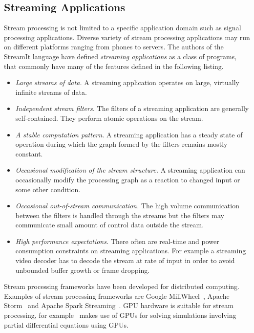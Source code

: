 \subsection{Streaming Applications}
\label{subsec:streaming-applications}
Stream processing is not limited to a specific application domain such as signal processing applications. Diverse variety of stream processing applications may run on different platforms ranging from phones to servers. The authors of the StreamIt language \cite{thies2002streamit} have defined \textit{streaming applications} as a class of programs, that commonly have many of the features defined in the following listing.

\begin{itemize}
    \item \textit{Large streams of data.} A streaming application operates on large, virtually infinite streams of data.
    \item \textit{Independent stream filters.} The filters of a streaming application are generally self-contained. They perform atomic operations on the stream.
    \item \textit{A stable computation pattern.} A streaming application has a steady state of operation during which the graph formed by the filters remains mostly constant.
    \item \textit{Occasional modification of the stream structure.} A streaming application can occasionally modify the processing graph as a reaction to changed input or some other condition.
    \item \textit{Occasional out-of-stream communication.} The high volume communication between the filters is handled through the streams but the filters may communicate small amount of control data outside the stream.
    \item \textit{High performance expectations.} There often are real-time and power consumption constraints on streaming applications. For example a streaming video decoder has to decode the stream at rate of input in order to avoid unbounded buffer growth or frame dropping.
\end{itemize}

Stream processing frameworks have been developed for distributed computing. Examples of stream processing frameworks are Google MillWheel~\cite{tyler2013millwheel}, Apache Storm~\cite{apache2016storm} and Apache Spark Streaming~\cite{apache2016spark}. GPU hardware is suitable for stream processing, for example~\cite{goddeke2011fast} makes use of GPUs for solving simulations involving partial differential equations using GPUs.

